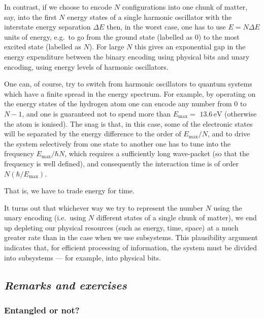 \documentclass[fleqn]{article}
\begin{document}
In contrast, if we choose to encode \(N\) configurations into one chunk of matter, say, into the first \(N\) energy states of a single harmonic oscillator with the interstate energy separation \(\Delta E\) then, in the worst case, one has to use \(E=N\Delta E\) units of energy, e.g.~to go from the ground state (labelled as \(0\)) to the most excited state (labelled as \(N\)).
For large \(N\) this gives an exponential gap in the energy expenditure between the binary encoding using physical bits and unary encoding, using energy levels of harmonic oscillators.

One can, of course, try to switch from harmonic oscillators to quantum systems which have a finite spread in the energy spectrum.
For example, by operating on the energy states of the hydrogen atom one can encode any number from \(0\) to \(N-1\), and one is guaranteed not to spend more than \(E_{\mathrm{max}}=\) \(13.6\,\mathrm{eV}\) (otherwise the atom is ionised).
The snag is that, in this case, some of the electronic states will be separated by the energy difference to the order of \(E_{\mathrm{max}}/N\), and to drive the system selectively from one state to another one has to tune into the frequency \(E_{\mathrm{max}}/\hbar N\), which requires a sufficiently long wave-packet (so that the frequency is well defined), and consequently the
interaction time is of order \(N(\hbar/E_{\mathrm{max}})\).

That is, we have to trade energy for time.

It turns out that whichever way we try to represent the number \(N\) using the unary encoding (i.e.~using \(N\) different states of a single chunk of matter), we end up depleting our physical resources (such as energy, time, space) at a much greater rate than in the case when we use subsystems.
This plausibility argument indicates that, for efficient processing of information, the system must be divided into subsystems --- for example, into physical bits.

\hypertarget{remarks-and-exercises-5}{%
\subsection{\texorpdfstring{\emph{Remarks and exercises}}{Remarks and exercises}}\label{remarks-and-exercises-5}}

\hypertarget{entangled-or-not}{%
\subsubsection{Entangled or not?}\label{entangled-or-not}}
\end{document}
